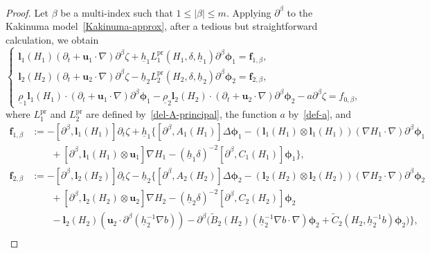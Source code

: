 \documentclass[11pt,leqno]{article}
\numberwithin{equation}{section}
\numberwithin{figure}{section}
\begin{document}
\begin{proof}
Let $\beta$ be a multi-index such that $1\leq|\beta|\leq m$. 
Applying $\partial^\beta$ to the Kakinuma model~\eqref{Kakinuma-approx}, after a tedious but straightforward calculation, we obtain 
%
\begin{equation}\label{Kakinuma-principal}
\begin{cases}
 \displaystyle
 {\bm l}_1(H_1)(\partial_t+\bm{u}_1\cdot\nabla)\partial^\beta\zeta
  + \underline{h}_1 L_1^\mathrm{pr}(H_1,\delta,\underline{h}_1)\partial^\beta\bm{\phi}_1 = \bm{f}_{1,\beta}, \\
 \displaystyle
 {\bm l}_2(H_2)(\partial_t+\bm{u}_2\cdot\nabla)\partial^\beta\zeta
  - \underline{h}_2 L_2^\mathrm{pr}(H_2,\delta,\underline{h}_2)\partial^\beta\bm{\phi}_2 = \bm{f}_{2,\beta}, \\
 \underline{\rho}_1{\bm l}_1(H_1)\cdot( \partial_t+\bm{u}_1\cdot\nabla )\partial^\beta\bm{\phi}_1 
  - \underline{\rho}_2{\bm l}_2(H_2)\cdot( \partial_t+\bm{u}_2\cdot\nabla )\partial^\beta\bm{\phi}_2 
  - a\partial^\beta\zeta = f_{0,\beta},
\end{cases}
\end{equation}
%
where $L_1^\mathrm{pr}$ and $L_2^\mathrm{pr}$ are defined by~\eqref{del-A-principal}, the function $a$ by~\eqref{def-a}, and 
%
\begin{align}
\bm{f}_{1,\beta} \label{f1beta}
&:= -[\partial^\beta,\bm{l}_1(H_1)]\partial_t\zeta
  + \underline{h}_1\bigl\{ [\partial^\beta,A_1(H_1)]\Delta\bm{\phi}_1
  - (\bm{l}_1(H_1)\otimes \bm{l}_1(H_1))(\nabla H_1\cdot\nabla)\partial^\beta\bm{\phi}_1 \\
&\qquad
  + [\partial^\beta,\bm{l}_1(H_1)\otimes\bm{u}_1]\nabla H_1
  - (\underline{h}_1\delta)^{-2}[\partial^\beta,C_1(H_1)]\bm{\phi}_1 \bigr\}, \nonumber \\
\bm{f}_{2,\beta} \label{f2beta}
&:= -[\partial^\beta,\bm{l}_2(H_2)]\partial_t\zeta
  - \underline{h}_2\bigl\{ [\partial^\beta,A_2(H_2)]\Delta\bm{\phi}_2
  - (\bm{l}_2(H_2)\otimes\bm{l}_2(H_2))(\nabla H_2\cdot\nabla)\partial^\beta\bm{\phi}_2  \\
&\qquad
  + [\partial^\beta,\bm{l}_2(H_2)\otimes\bm{u}_2]\nabla H_2 
  - (\underline{h}_2\delta)^{-2}[\partial^\beta,C_2(H_2)]\bm{\phi}_2  \nonumber \\
&\qquad
  - \bm{l}_2(H_2)(\bm{u}_2\cdot\partial^\beta(\underline{h}_2^{-1}\nabla b))
  - \partial^\beta\bigl( \tilde{B}_2(H_2) (\underline{h}_2^{-1}\nabla b\cdot\nabla)\bm{\phi}_2
   + \tilde{C}_2(H_2,\underline{h}_2^{-1}b)\bm{\phi}_2 \bigr) \bigr\},  \nonumber \\

\end{align}
\end{proof}
\end{document}
